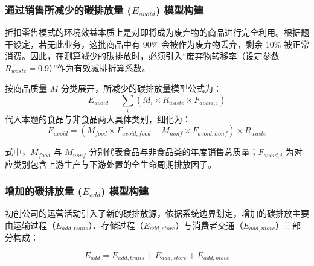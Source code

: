 \documentclass{article}
\begin{document}
\subsubsection{通过销售所减少的碳排放量 ($E_{avoid}$) 模型构建}

折扣零售模式的环境效益本质上是对即将成为废弃物的商品进行完全利用。根据题干设定，若无此业务，这批商品中有 90\% 会被作为废弃物丢弃，剩余 10\% 被正常消费。因此，在测算减少的碳排放时，必须引入“废弃物转移率（设定参数 $R_{waste}=0.9$）”作为有效减排折算系数。

按商品质量 $M$ 分类展开，所减少的碳排放量模型公式为：
\begin{equation}
    E_{avoid} = \sum_{i} \left( M_i \times R_{waste} \times F_{avoid, i} \right) \label{eq:avoid}
\end{equation}
代入本题的食品与非食品两大具体类别，细化为：
\begin{equation}
    E_{avoid} = \left( M_{food} \times F_{avoid, food} + M_{nonf} \times F_{avoid, nonf} \right) \times R_{waste}
\end{equation}

式中，$M_{food}$ 与 $M_{nonf}$ 分别代表食品与非食品类的年度销售总质量；$F_{avoid, i}$ 为对应类别包含上游生产与下游处置的全生命周期排放因子。

\subsubsection{增加的碳排放量 ($E_{add}$) 模型构建}

初创公司的运营活动引入了新的碳排放源，依据系统边界划定，增加的碳排放主要由运输过程（$E_{add, trans}$）、存储过程（$E_{add, store}$）与消费者交通（$E_{add, move}$）三部分构成：

\begin{equation}
    E_{add} = E_{add, trans} + E_{add, store} + E_{add, move} \label{eq:add}
\end{equation}
\end{document}
